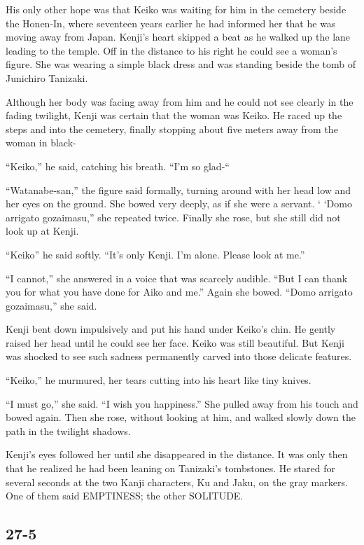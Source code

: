 \documentclass[]{article}
\begin{document}
{His only other hope was that Keiko was waiting for him in the cemetery beside the Honen-In, where seventeen years earlier he had informed her that he was moving away from Japan. Kenji’s heart skipped a beat as he walked up the lane leading to the temple. Off in the distance to his right he could see a woman’s figure. She was wearing a simple black dress and was standing beside the tomb of Junichiro Tanizaki.

Although her body was facing away from him and he could not see clearly in the fading twilight, Kenji was certain that the woman was Keiko. He raced up the steps and into the cemetery, finally stopping about five meters away from the woman in black-

“Keiko,” he said, catching his breath. “I’m so glad-“

“Watanabe-san,” the figure said formally, turning around with her head low and her eyes on the ground. She bowed very deeply, as if she were a servant. ‘ ‘Domo arrigato gozaimasu,” she repeated twice. Finally she rose, but she still did not look up at Kenji.

“Keiko” he said softly. “It’s only Kenji. I’m alone. Please look at me.”

“I cannot,” she answered in a voice that was scarcely audible. “But I can thank you for what you have done for Aiko and me.” Again she bowed. “Domo arrigato gozaimasu,” she said.

Kenji bent down impulsively and put his hand under Keiko’s chin. He gently raised her head until he could see her face. Keiko was still beautiful. But Kenji was shocked to see such sadness permanently carved into those delicate features.

“Keiko,” he murmured, her tears cutting into his heart like tiny knives.

“I must go,” she said. “I wish you happiness.” She pulled away from his touch and bowed again. Then she rose, without looking at him, and walked slowly down the path in the twilight shadows.

Kenji’s eyes followed her until she disappeared in the distance. It was only then that he realized he had been leaning on Tanizaki’s tombstones. He stared for several seconds at the two Kanji characters, Ku and Jaku, on the gray markers. One of them said EMPTINESS; the other SOLITUDE.


\subsection{27-5}

}
\end{document}
